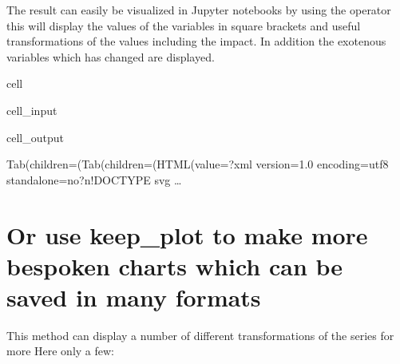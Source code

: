 \documentclass[letterpaper,10pt,english]{jupyterBook}
\begin{document}
\sphinxAtStartPar
The result can easily be visualized in Jupyter notebooks by using the \sphinxcode{\sphinxupquote{{[}.{]}}} operator this will display the values of the variables in square brackets and useful
transformations of the values including the impact. In addition the exotenous variables which has changed are displayed.

\sphinxAtStartPar
{}

\begin{sphinxuseclass}{cell}\begin{sphinxVerbatimInput}

\begin{sphinxuseclass}{cell_input}
\begin{sphinxVerbatim}[commandchars=\\\{\}]
\PYG{p}{[}\PYG{p}{]}
\end{sphinxVerbatim}

\end{sphinxuseclass}\end{sphinxVerbatimInput}
\begin{sphinxVerbatimOutput}

\begin{sphinxuseclass}{cell_output}
\begin{sphinxVerbatim}[commandchars=\\\{\}]
Tab(children=(Tab(children=(HTML(value=\PYGZsq{}\PYGZlt{}?xml version=\PYGZdq{}1.0\PYGZdq{} encoding=\PYGZdq{}utf\PYGZhy{}8\PYGZdq{} standalone=\PYGZdq{}no\PYGZdq{}?\PYGZgt{}\PYGZbs{}n\PYGZlt{}!DOCTYPE svg …
\end{sphinxVerbatim}

\begin{sphinxVerbatim}[commandchars=\\\{\}]

\end{sphinxVerbatim}

\end{sphinxuseclass}\end{sphinxVerbatimOutput}

\end{sphinxuseclass}

\section{Or use keep\_plot to make more bespoken charts which can be saved  in many formats}
\label{\detokenize{content/howto/experiments/Standard experiment simple:or-use-keep-plot-to-make-more-bespoken-charts-which-can-be-saved-in-many-formats}}
\sphinxAtStartPar
This method can display a number of different transformations of the series for more 
Here only a few:
\end{document}
